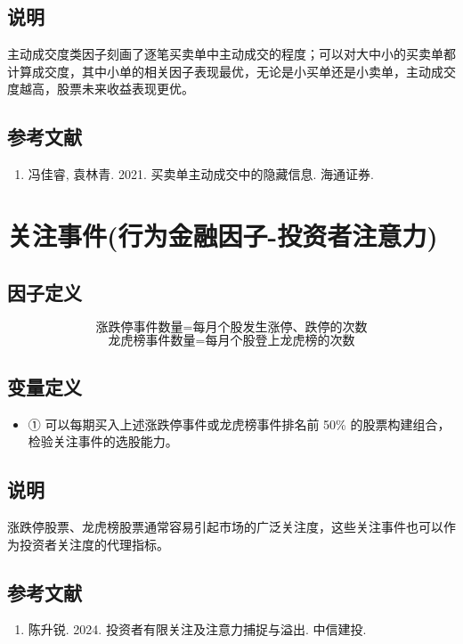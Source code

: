 \documentclass{article}
\begin{document}
\subsection{说明}
主动成交度类因子刻画了逐笔买卖单中主动成交的程度；可以对大中小的买卖单都计算成交度，其中小单的相关因子表现最优，无论是小买单还是小卖单，主动成交度越高，股票未来收益表现更优。

\subsection{参考文献}
\begin{enumerate}
    \item 冯佳睿, 袁林青. 2021. 买卖单主动成交中的隐藏信息. 海通证券.
\end{enumerate}

\section{关注事件(行为金融因子-投资者注意力)}

\subsection{因子定义}
\begin{equation}
    \text{涨跌停事件数量} = \text{每月个股发生涨停、跌停的次数}
\end{equation}
\begin{equation}
    \text{龙虎榜事件数量} = \text{每月个股登上龙虎榜的次数}
\end{equation}

\subsection{变量定义}
\begin{itemize}
    \item ① 可以每期买入上述涨跌停事件或龙虎榜事件排名前 50\% 的股票构建组合，检验关注事件的选股能力。
\end{itemize}

\subsection{说明}
涨跌停股票、龙虎榜股票通常容易引起市场的广泛关注度，这些关注事件也可以作为投资者关注度的代理指标。

\subsection{参考文献}
\begin{enumerate}
    \item 陈升锐. 2024. 投资者有限关注及注意力捕捉与溢出. 中信建投.
\end{enumerate}
\end{document}
